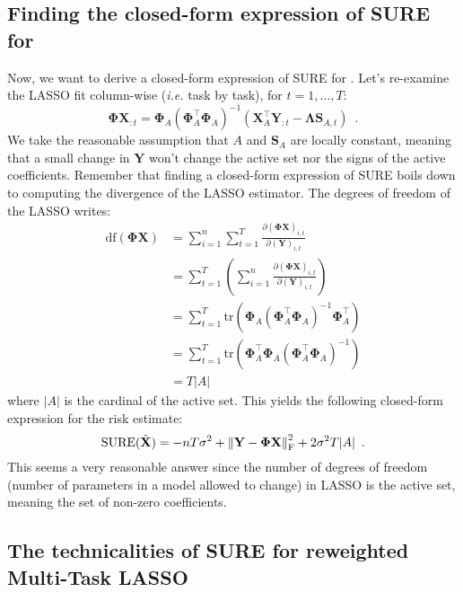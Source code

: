 \documentclass[a4paper,10pt]{article}
\theoremstyle{definition}
\begin{document}
\subsection*{Finding the closed-form expression of SURE for }

Now, we want to derive a closed-form expression of SURE for . Let's re-examine the LASSO fit column-wise (\textit{i.e.} task by task), for $t=1, \dots, T$:
%
\begin{equation*}
    \mathbf{\Phi X}_{:t}
    = \mathbf{\Phi}_A(\mathbf{\Phi}_A^{\top}\mathbf{\Phi}_A)^{-1}(\mathbf{X}^{\top}_A\mathbf{Y}_{:t} - \mathbf{\Lambda}\mathbf{S}_{A, t})
    \enspace .
\end{equation*}
%
We take the reasonable assumption that $A$ and $\mathbf{S}_A$ are locally constant, meaning that a small change in $\mathbf{Y}$ won't change the active set nor the signs of the active
coefficients. Remember that finding a closed-form expression of SURE boils down to computing the divergence of the LASSO estimator.
The degrees of freedom of the LASSO writes:
%
\begin{align*}
    \text{df}(\mathbf{\Phi X})
    &= \sum_{i=1}^n \sum_{t=1}^T \frac{\partial (\mathbf{\Phi X})_{i,t}}{\partial (\mathbf{Y})_{i, t}} \\
    &= \sum_{t=1}^T \left ( \sum_{i=1}^n \frac{\partial (\mathbf{\Phi X})_{i,t}}{\partial (\mathbf{Y})_{i, t}} \right ) \\
    &= \sum_{t=1}^T \text{tr}(\mathbf{\Phi}_A (\mathbf{\Phi}_A^{\top} \mathbf{\Phi}_A)^{-1}\mathbf{\Phi}_A^{\top}) \\
    &= \sum_{t=1}^T \text{tr}(\mathbf{\Phi}_A^{\top}\mathbf{\Phi}_A (\mathbf{\Phi}_A^{\top} \mathbf{\Phi}_A)^{-1}) \\
    &= T \lvert A \rvert
\end{align*}
%
where $\lvert A \rvert$ is the cardinal of the active set. This yields the following closed-form expression for the risk estimate:
%
\begin{equation*}
    \text{SURE}(\hat{\bf{X}}) = - n T \sigma^2 + \left \lVert \mathbf{Y} -  \mathbf{\Phi X} \right \rVert^2_{\text{F}} + 2 \sigma^2 T \lvert A \rvert
    \enspace .
\end{equation*}
%
This seems a very reasonable answer since the number of degrees of freedom (number of parameters in a model allowed to change) in LASSO is the active set, meaning the set of non-zero
coefficients.

\subsection*{The technicalities of SURE for reweighted Multi-Task LASSO}
\end{document}
